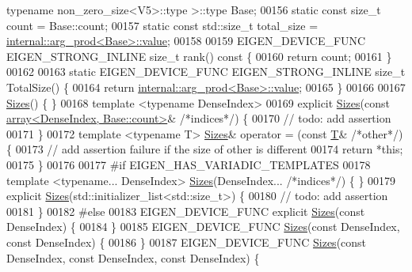 \begin{DoxyCode}
{      typename} non\_zero\_size<V5>::type >::type Base;
00156   \textcolor{keyword}{static} \textcolor{keyword}{const} \textcolor{keywordtype}{size\_t} count = Base::count;
00157   \textcolor{keyword}{static} \textcolor{keyword}{const} std::size\_t total\_size = \hyperlink{struct_eigen_1_1internal_1_1arg__prod}{internal::arg\_prod<Base>::value};
00158 
00159   EIGEN\_DEVICE\_FUNC EIGEN\_STRONG\_INLINE \textcolor{keywordtype}{size\_t} rank()\textcolor{keyword}{ const }\{
00160     \textcolor{keywordflow}{return} count;
00161   \}
00162 
00163   \textcolor{keyword}{static} EIGEN\_DEVICE\_FUNC EIGEN\_STRONG\_INLINE \textcolor{keywordtype}{size\_t} TotalSize() \{
00164     \textcolor{keywordflow}{return} \hyperlink{struct_eigen_1_1internal_1_1arg__prod}{internal::arg\_prod<Base>::value};
00165   \}
00166 
00167   \hyperlink{struct_eigen_1_1_sizes}{Sizes}() \{ \}
00168   \textcolor{keyword}{template} <\textcolor{keyword}{typename} DenseIndex>
00169   \textcolor{keyword}{explicit} \hyperlink{struct_eigen_1_1_sizes}{Sizes}(\textcolor{keyword}{const} \hyperlink{class_eigen_1_1array}{array<DenseIndex, Base::count>}& \textcolor{comment}{/*indices*/}) \{
00170     \textcolor{comment}{// todo: add assertion}
00171   \}
00172   \textcolor{keyword}{template} <\textcolor{keyword}{typename} T> \hyperlink{struct_eigen_1_1_sizes}{Sizes}& operator = (\textcolor{keyword}{const} \hyperlink{group___sparse_core___module}{T}& \textcolor{comment}{/*other*/}) \{
00173     \textcolor{comment}{// add assertion failure if the size of other is different}
00174     \textcolor{keywordflow}{return} *\textcolor{keyword}{this};
00175   \}
00176 
00177 \textcolor{preprocessor}{#if EIGEN\_HAS\_VARIADIC\_TEMPLATES}
00178   \textcolor{keyword}{template} <\textcolor{keyword}{typename}... DenseIndex> \hyperlink{struct_eigen_1_1_sizes}{Sizes}(DenseIndex... \textcolor{comment}{/*indices*/}) \{ \}
00179   \textcolor{keyword}{explicit} \hyperlink{struct_eigen_1_1_sizes}{Sizes}(std::initializer\_list<std::size\_t>) \{
00180     \textcolor{comment}{// todo: add assertion}
00181   \}
00182 \textcolor{preprocessor}{#else}
00183   EIGEN\_DEVICE\_FUNC \textcolor{keyword}{explicit} \hyperlink{struct_eigen_1_1_sizes}{Sizes}(\textcolor{keyword}{const} DenseIndex) \{
00184   \}
00185   EIGEN\_DEVICE\_FUNC \hyperlink{struct_eigen_1_1_sizes}{Sizes}(\textcolor{keyword}{const} DenseIndex, \textcolor{keyword}{const} DenseIndex) \{
00186   \}
00187   EIGEN\_DEVICE\_FUNC \hyperlink{struct_eigen_1_1_sizes}{Sizes}(\textcolor{keyword}{const} DenseIndex, \textcolor{keyword}{const} DenseIndex, \textcolor{keyword}{const} DenseIndex) \{

\end{DoxyCode}
